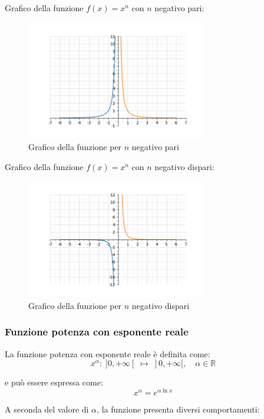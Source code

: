 Grafico della funzione $f(x) = x^n$ con $n$ negativo pari:
\begin{figure}[H]
    \centering
    \includegraphics[width=0.7\textwidth]{./img/esponente_neg_pari.png}
    \caption{Grafico della funzione per $n$ negativo pari}
    \label{fig:esponente_neg_pari}
\end{figure}
\FloatBarrier

Grafico della funzione $f(x) = x^n$ con $n$ negativo dispari:
\begin{figure}[H]
    \centering
    \includegraphics[width=0.7\textwidth]{./img/esponente_neg_dispari.png}
    \caption{Grafico della funzione per $n$ negativo dispari}
    \label{fig:esponente_neg_dispari}
\end{figure}
\FloatBarrier

\subsubsection{Funzione potenza con esponente reale}

La funzione potenza con esponente reale è definita come:
\[
x^\alpha : \; ]0, +\infty[ \; \longmapsto \; ]0, +\infty[, \quad \alpha \in \mathbb{R}
\]

e può essere espressa come:
\[
x^\alpha = e^{\alpha \ln x}
\]

A seconda del valore di $\alpha$, la funzione presenta diversi comportamenti:

